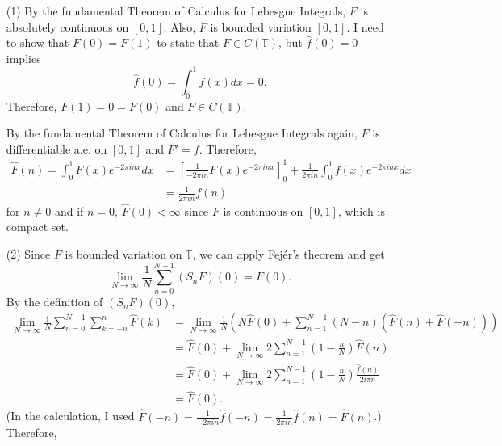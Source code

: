 \documentclass{article}
\begin{document}
\begin{enumerate}
\item[(1)] By the fundamental Theorem of Calculus for Lebesgue Integrals, $F$ is absolutely continuous on $[0, 1]$. Also, $F$ is bounded variation $[0,1]$. I need to show that $F(0)=F(1)$ to state that $F\in C(\mathbb{T})$, but $\hat{f}(0)=0$ implies
\begin{equation*}
\hat{f}(0)=\int_0^1 f(x)dx=0.
\end{equation*}
Therefore, $F(1)=0=F(0)$ and $F\in C(\mathbb{T})$.

By the fundamental Theorem of Calculus for Lebesgue Integrals again, $F$ is differentiable a.e. on $[0,1]$ and $F'=f$. Therefore,
\begin{equation*}
\begin{split}
\hat{F}(n)=\int_0^1 F(x)e^{-2\pi i n x} dx&=\left[\frac{1}{-2\pi i n} F(x)e^{-2\pi i n x}\right]_0^1 + \frac{1}{2\pi i n}\int_0^1 f(x)e^{-2\pi i n x} dx \\
&=\frac{1}{2\pi i n}f(n)
\end{split}
\end{equation*}
for $n\neq 0$ and if $n=0$, $\hat{F}(0)<\infty$ since $F$ is continuous on $[0,1]$, which is compact set.
\item[(2)] Since $F$ is bounded variation on $\mathbb{T}$, we can apply Fej\'er's theorem and get
\begin{equation*}
\lim\limits_{N\rightarrow\infty}\frac{1}{N}\sum\limits_{n=0}^{N-1}(S_n F)(0)=F(0).
\end{equation*}
By the definition of $(S_n F)(0)$,
\begin{equation*}
\begin{split}
\lim\limits_{N\rightarrow\infty}\frac{1}{N}\sum\limits_{n=0}^{N-1}\sum\limits_{k=-n}^n \hat{F}(k)&=\lim\limits_{N\rightarrow\infty}\frac{1}{N}\left(N\hat{F}(0)+\sum\limits_{n=1}^{N-1}(N-n)(\hat{F}(n)+\hat{F}(-n))\right) \\
&=\hat{F}(0)+\lim\limits_{N\rightarrow\infty}2\sum\limits_{n=1}^{N-1}\left(1-\frac{n}{N}\right)\hat{F}(n) \\
&=\hat{F}(0)+\lim\limits_{N\rightarrow\infty}2\sum\limits_{n=1}^{N-1}\left(1-\frac{n}{N}\right)\frac{\hat{f}(n)}{2i\pi n} \\
&=\hat{F}(0).
\end{split}
\end{equation*}
(In the calculation, I used $\hat{F}(-n)=\frac{1}{-2\pi i n}\hat{f}(-n)=\frac{1}{2\pi i n}\hat{f}(n)=\hat{F}(n)$.) Therefore,
\begin{equation*}

\end{equation*}
\end{enumerate}
\end{document}
